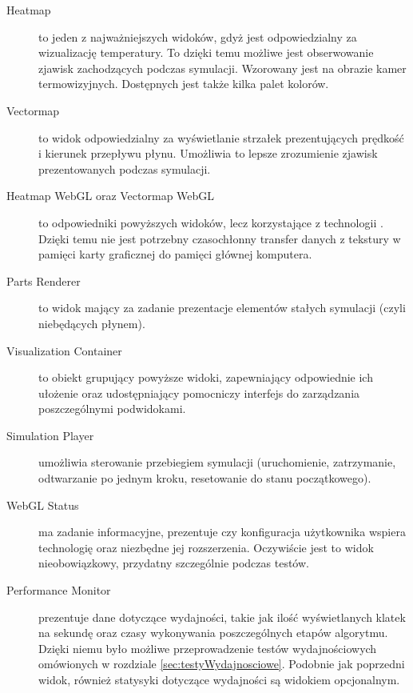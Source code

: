 \begin{description}

\item[Heatmap] to jeden z najważniejszych widoków, gdyż jest odpowiedzialny
za wizualizację temperatury. To dzięki temu możliwe jest obserwowanie zjawisk
zachodzących podczas symulacji. Wzorowany jest na obrazie kamer termowizyjnych.
Dostępnych jest także kilka palet kolorów.

\item[Vectormap] to widok odpowiedzialny za wyświetlanie strzałek prezentujących
prędkość i kierunek przepływu płynu. Umożliwia to lepsze zrozumienie zjawisk
prezentowanych podczas symulacji.

\item[Heatmap WebGL oraz Vectormap WebGL] to odpowiedniki powyższych widoków,
lecz korzystające z technologii . Dzięki temu nie jest potrzebny
czasochłonny transfer danych z tekstury w pamięci karty graficznej do pamięci
głównej komputera.

\item[Parts Renderer] to widok mający za zadanie prezentacje elementów
stałych symulacji (czyli niebędących płynem).

\item[Visualization Container] to obiekt grupujący powyższe widoki, zapewniający
odpowiednie ich ułożenie oraz udostępniający pomocniczy interfejs do zarządzania
poszczególnymi podwidokami.

\item[Simulation Player] umożliwia sterowanie przebiegiem symulacji
(uruchomienie, zatrzymanie, odtwarzanie po jednym kroku, resetowanie do stanu
początkowego).

\item[WebGL Status] ma zadanie informacyjne, prezentuje czy konfiguracja
użytkownika wspiera technologię  oraz niezbędne jej rozszerzenia.
Oczywiście jest to widok nieobowiązkowy, przydatny szczególnie podczas testów.

\item[Performance Monitor] prezentuje dane dotyczące wydajności, takie jak ilość
wyświetlanych klatek na sekundę oraz czasy wykonywania poszczególnych etapów
algorytmu. Dzięki niemu było możliwe przeprowadzenie testów wydajnościowych
omówionych w rozdziale \ref{sec:testyWydajnosciowe}. Podobnie jak poprzedni widok,
również statysyki dotyczące wydajności są widokiem opcjonalnym.

\end{description}

